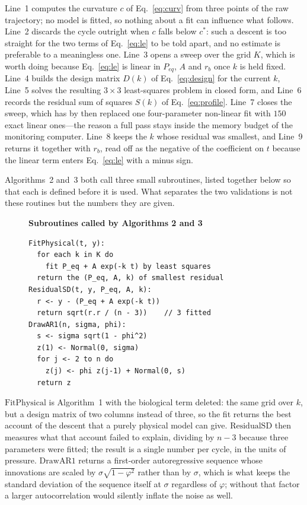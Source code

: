\documentclass[runningheads]{llncs}
\newcommand{\rb}{\ensuremath{r_{b}}}
\begin{document}
Line~1 computes the curvature
$c$ of Eq.~\eqref{eq:curv} from three points of the raw trajectory; no
model is fitted, so nothing about a fit can influence what follows.
Line~2 discards the cycle outright when $c$ falls below $c^{*}$: such a
descent is too straight for the two terms of Eq.~\eqref{eq:le} to be
told apart, and no estimate is preferable to a meaningless one.
Line~3 opens a sweep over the grid $K$, which is worth doing because
Eq.~\eqref{eq:le} is linear in $P_{eq}$, $A$ and \rb{} once $k$ is
held fixed. Line~4 builds the design matrix $D(k)$ of
Eq.~\eqref{eq:design} for the current $k$, Line~5 solves the resulting
$3\times3$ least-squares problem in closed form, and Line~6 records the
residual sum of squares $S(k)$ of Eq.~\eqref{eq:profile}. Line~7 closes
the sweep, which has by then replaced one four-parameter non-linear
fit with $150$ exact linear ones---the reason a full pass stays inside
the memory budget of the monitoring computer. Line~8 keeps the $k$
whose residual was smallest, and Line~9 returns it together with
\rb{}, read off as the negative of the coefficient on $t$ because the
linear term enters Eq.~\eqref{eq:le} with a minus sign.

Algorithms~2 and~3 both call three small subroutines, listed together
below so that each is defined before it is used. What separates the two
validations is not these routines but the numbers they are given.

\begin{figure}[t]
\noindent\textbf{Subroutines called by Algorithms 2 and 3}

\begin{verbatim}
FitPhysical(t, y):
  for each k in K do
    fit P_eq + A exp(-k t) by least squares
  return the (P_eq, A, k) of smallest residual
ResidualSD(t, y, P_eq, A, k):
  r <- y - (P_eq + A exp(-k t))
  return sqrt(r.r / (n - 3))    // 3 fitted
DrawAR1(n, sigma, phi):
  s <- sigma sqrt(1 - phi^2)
  z(1) <- Normal(0, sigma)
  for j <- 2 to n do
    z(j) <- phi z(j-1) + Normal(0, s)
  return z
\end{verbatim}
\end{figure}

$\mathrm{FitPhysical}$ is Algorithm~1 with the biological term deleted:
the same grid over $k$, but a design matrix of two columns instead of
three, so the fit returns the best account of the descent that a purely
physical model can give. $\mathrm{ResidualSD}$ then measures what that
account failed to explain, dividing by $n-3$ because three parameters
were fitted; the result is a single number per cycle, in the units of
pressure. $\mathrm{DrawAR1}$ returns a first-order autoregressive
sequence whose innovations are scaled by $\sigma\sqrt{1-\varphi^{2}}$
rather than by $\sigma$, which is what keeps the standard deviation of
the sequence itself at $\sigma$ regardless of $\varphi$; without that
factor a larger autocorrelation would silently inflate the noise as
well.
\end{document}
